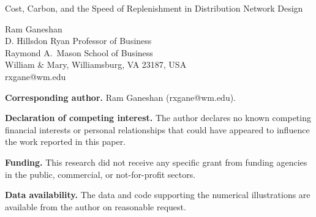 \documentclass[11pt]{article}
\begin{document}
\begin{center}
{\Large Cost, Carbon, and the Speed of Replenishment in Distribution Network Design}

\vspace{1.5em}
Ram Ganeshan\\
D. Hillsdon Ryan Professor of Business\\
Raymond A.\ Mason School of Business\\
William \& Mary, Williamsburg, VA 23187, USA\\
rxgane@wm.edu
\end{center}

\vspace{1.5em}
\textbf{Corresponding author.} Ram Ganeshan (rxgane@wm.edu).

\textbf{Declaration of competing interest.} The author declares no known competing financial interests or
personal relationships that could have appeared to influence the work reported in this paper.

\textbf{Funding.} This research did not receive any specific grant from funding agencies in the public,
commercial, or not-for-profit sectors.

\textbf{Data availability.} The data and code supporting the numerical illustrations are available from the
author on reasonable request.
\end{document}

